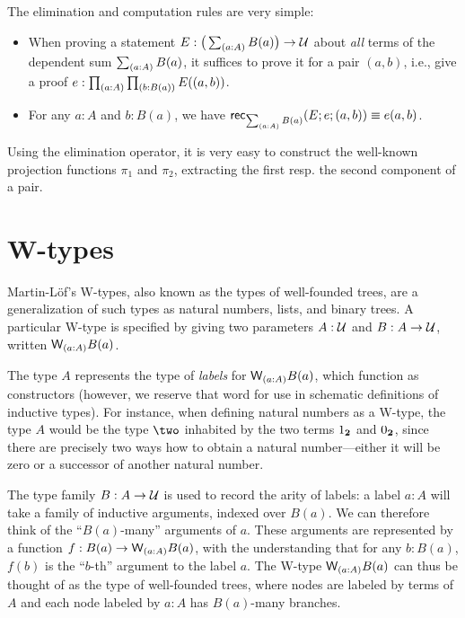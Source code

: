 The elimination and computation rules are very simple:

\begin{itemize}
\item When proving a statement $E : \big(\sm{a:A} B(a)\big) \to \type$ about \emph{all} terms of the dependent sum $\sm{a:A} B(a)$, it suffices to prove it for a pair $(a,b)$, i.e., give a proof $e : \prd{a:A}{b:B(a)} E((a,b))$.
\end{itemize}

\begin{itemize}
\item For any $a : A$ and $b : B(a)$, we have $\rec{\sm{a:A} B(a)}(E;e;(a,b)) \equiv e(a,b)$.
\end{itemize}
Using the elimination operator, it is very easy to construct the well-known projection functions $\pi_1$ and $\pi_2$, extracting the first resp. the second component of a pair.


\section{W-types}
\label{sec:w-types}

Martin-L{\"o}f's W-types, also known as the types of well-founded trees, are a generalization of such types as natural numbers, lists, and binary trees. A particular W-type is specified by giving two parameters $A : \mathcal{U}$ and $B : A \to \mathcal{U}$, written $\wtype{a:A} B(a)$.

The type $A$ represents the type of \emph{labels} for $\wtype{a :A} B(a)$, which function as constructors (however, we reserve that word for use in schematic definitions of inductive types). For instance, when defining natural numbers as a W-type, the type $A$ would be the type $\two$ inhabited by the two terms $1_{\mathbf{2}}$ and $0_{\mathbf{2}}$, since there are precisely two ways how to obtain a natural number---either it will be zero or a successor of another natural number. 

The type family $B : A \to \mathcal{U}$ is used to record the arity of labels: a label $a : A$ will take a family of inductive arguments, indexed over $B(a)$. We can therefore think of the ``$B(a)$-many'' arguments of $a$. These arguments are represented by a function $f : B(a) \to \wtype{a :A} B(a)$, with the understanding that for any $b : B(a)$, $f(b)$ is the ``$b$-th'' argument to the label $a$. The W-type $\wtype{a :A} B(a)$ can thus be thought of as the type of well-founded trees, where nodes are labeled by terms of $A$ and each node labeled by $a : A$ has $B(a)$-many branches.

